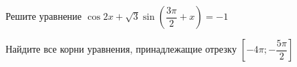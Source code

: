 \begin{ex}
	\begin{condition}
		\begin{enumcols}[label=\asbuk*)]
			\item Решите уравнение \( \cos 2x + \sqrt{3} \sin{\left(\dfrac{3\pi}{2}+x\right)} = -1 \)
			\item Найдите все корни уравнения, принадлежащие отрезку \( \left[-4\pi;-\dfrac{5\pi}{2}\right] \)
		\end{enumcols}
	\end{condition}
\end{ex}